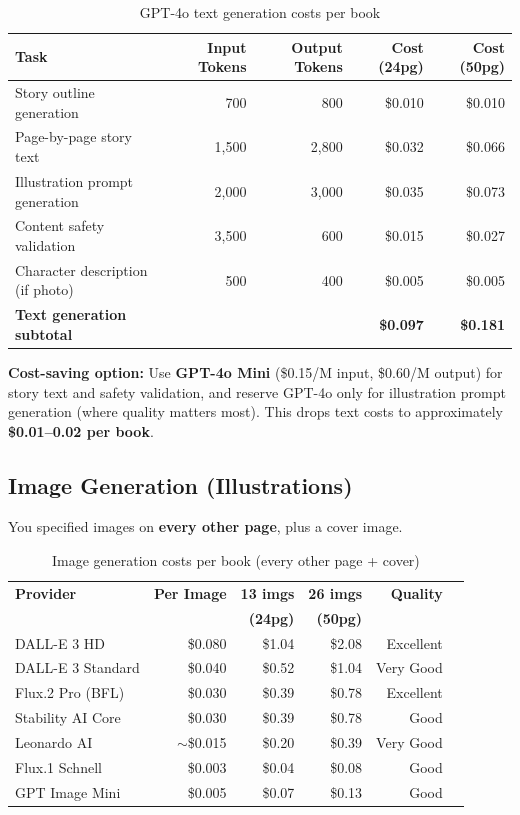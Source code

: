 \documentclass[12pt, letterpaper, oneside]{book}
\begin{document}
\begin{table}[H]
\centering
\begin{tabularx}{\textwidth}{Xrrrr}
\toprule
\textbf{Task} & \textbf{Input Tokens} & \textbf{Output Tokens} & \textbf{Cost (24pg)} & \textbf{Cost (50pg)} \\
\midrule
Story outline generation & 700 & 800 & \$0.010 & \$0.010 \\
Page-by-page story text & 1{,}500 & 2{,}800 & \$0.032 & \$0.066 \\
Illustration prompt generation & 2{,}000 & 3{,}000 & \$0.035 & \$0.073 \\
Content safety validation & 3{,}500 & 600 & \$0.015 & \$0.027 \\
Character description (if photo) & 500 & 400 & \$0.005 & \$0.005 \\
\midrule
\textbf{Text generation subtotal} & & & \textbf{\$0.097} & \textbf{\$0.181} \\
\bottomrule
\end{tabularx}
\caption{GPT-4o text generation costs per book}
\end{table}

\begin{infobox}
\textbf{Cost-saving option:} Use \textbf{GPT-4o Mini} (\$0.15/M input, \$0.60/M output) for story text and safety validation, and reserve GPT-4o only for illustration prompt generation (where quality matters most). This drops text costs to approximately \textbf{\$0.01--0.02 per book}.
\end{infobox}

\subsection{Image Generation (Illustrations)}

You specified images on \textbf{every other page}, plus a cover image.

\begin{table}[H]
\centering
\begin{tabularx}{\textwidth}{Xrrrrr}
\toprule
\textbf{Provider} & \textbf{Per Image} & \textbf{13 imgs} & \textbf{26 imgs} & \textbf{Quality} \\
& & \textbf{(24pg)} & \textbf{(50pg)} & \\
\midrule
DALL-E 3 HD & \$0.080 & \$1.04 & \$2.08 & Excellent \\
DALL-E 3 Standard & \$0.040 & \$0.52 & \$1.04 & Very Good \\
Flux.2 Pro (BFL) & \$0.030 & \$0.39 & \$0.78 & Excellent \\
Stability AI Core & \$0.030 & \$0.39 & \$0.78 & Good \\
Leonardo AI & $\sim$\$0.015 & \$0.20 & \$0.39 & Very Good \\
Flux.1 Schnell & \$0.003 & \$0.04 & \$0.08 & Good \\
GPT Image Mini & \$0.005 & \$0.07 & \$0.13 & Good \\
\bottomrule
\end{tabularx}
\caption{Image generation costs per book (every other page + cover)}
\end{table}
\end{document}
